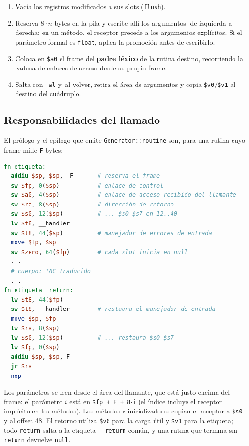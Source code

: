 \documentclass[11pt,a4paper]{article}
\begin{document}
\begin{enumerate}[leftmargin=1.6em]
  \item Vacía los registros modificados a sus slots (\texttt{flush}).
  \item Reserva $8 \cdot n$ bytes en la pila y escribe allí los argumentos, de
        izquierda a derecha; en un método, el receptor precede a los argumentos
        explícitos. Si el parámetro formal es \texttt{float}, aplica la
        promoción antes de escribirlo.
  \item Coloca en \texttt{\$a0} el frame del \textbf{padre léxico} de la rutina
        destino, recorriendo la cadena de enlaces de acceso desde su propio
        frame.
  \item Salta con \texttt{jal} y, al volver, retira el área de argumentos y
        copia \texttt{\$v0}/\texttt{\$v1} al destino del cuádruplo.
\end{enumerate}

\subsection{Responsabilidades del llamado}

El prólogo y el epílogo que emite \texttt{Generator::routine} son, para una
rutina cuyo frame mide \texttt{F} bytes:

\begin{lstlisting}[language=MIPS,caption={Prólogo y epílogo generados para cada rutina.}]
fn_etiqueta:
  addiu $sp, $sp, -F       # reserva el frame
  sw $fp, 0($sp)           # enlace de control
  sw $a0, 4($sp)           # enlace de acceso recibido del llamante
  sw $ra, 8($sp)           # dirección de retorno
  sw $s0, 12($sp)          # ... $s0-$s7 en 12..40
  lw $t8, __handler
  sw $t8, 44($sp)          # manejador de errores de entrada
  move $fp, $sp
  sw $zero, 64($fp)        # cada slot inicia en null
  ...
  # cuerpo: TAC traducido
  ...
fn_etiqueta__return:
  lw $t8, 44($fp)
  sw $t8, __handler        # restaura el manejador de entrada
  move $sp, $fp
  lw $ra, 8($sp)
  lw $s0, 12($sp)          # ... restaura $s0-$s7
  lw $fp, 0($sp)
  addiu $sp, $sp, F
  jr $ra
  nop
\end{lstlisting}

Los parámetros se leen desde el área del llamante, que está justo encima del
frame: el parámetro $i$ está en \texttt{\$fp + F + 8$\cdot$i} (el índice incluye
el receptor implícito en los métodos). Los métodos e inicializadores copian el
receptor a \texttt{\$s0} y al offset 48. El retorno utiliza \texttt{\$v0} para la
carga útil y \texttt{\$v1} para la etiqueta; todo \texttt{return} salta a la
etiqueta \texttt{\_\_return} común, y una rutina que termina sin
\texttt{return} devuelve \texttt{null}.
\end{document}
